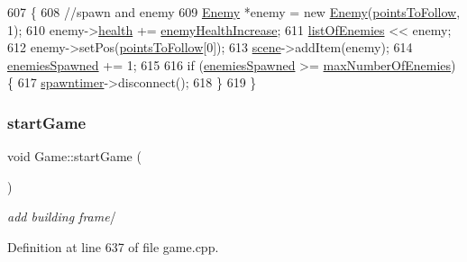 \begin{DoxyCode}
607 \{
608     \textcolor{comment}{//spawn and enemy}
609     \hyperlink{class_enemy}{Enemy} *enemy = \textcolor{keyword}{new} \hyperlink{class_enemy}{Enemy}(\hyperlink{class_game_abe95b23433c0353887099928a5573c59}{pointsToFollow}, 1);
610     enemy->\hyperlink{class_enemy_aedd5e7bf8ef07ee97be433c853a10d8d}{health} += \hyperlink{class_game_ac0038cbbcfbd5d8b32600cd9f42cd09b}{enemyHealthIncrease};
611     \hyperlink{class_game_ab96914bfc1e59035233105abfb0787fe}{listOfEnemies} << enemy;
612     enemy->setPos(\hyperlink{class_game_abe95b23433c0353887099928a5573c59}{pointsToFollow}[0]);
613     \hyperlink{class_game_a8119e3b9a632906c6808fa294b46a92a}{scene}->addItem(enemy);
614     \hyperlink{class_game_a6ac18c388eda83ceb3212e099b3b8473}{enemiesSpawned} += 1;
615 
616     \textcolor{keywordflow}{if} (\hyperlink{class_game_a6ac18c388eda83ceb3212e099b3b8473}{enemiesSpawned} >= \hyperlink{class_game_aaee1756450bae685777ee86c45ef4f78}{maxNumberOfEnemies}) \{
617         \hyperlink{class_game_a4a8895723160ca3585fe140e476aea1f}{spawntimer}->disconnect();
618     \}
619 \}
\end{DoxyCode}
\mbox{\label{class_game_ae8638ccdb0ef3bf39a6affa30aa1258f}} 
\subsubsection{\texorpdfstring{start\+Game}{startGame}}
{\footnotesize\ttfamily void Game\+::start\+Game (\begin{DoxyParamCaption}{ }\end{DoxyParamCaption})\hspace{0.3cm}{\ttfamily [slot]}}

{\itshape add building frame}/ 

Definition at line 637 of file game.\+cpp.



